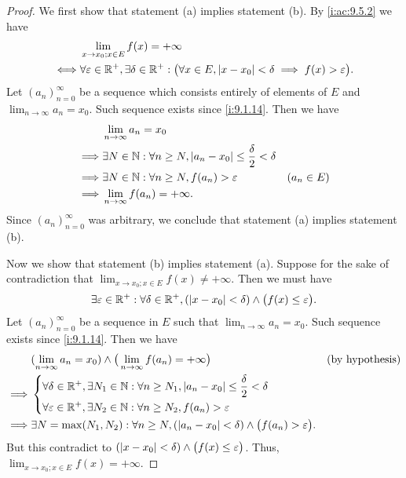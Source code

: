 \begin{proof}
  We first show that statement (a) implies statement (b).
  By \cref{i:ac:9.5.2} we have
  \begin{align*}
         & \lim_{x \to x_0 ; x \in E} f(x) = +\infty                                                                                              \\
    \iff & \forall \varepsilon \in \mathbb{R}^+, \exists \delta \in \mathbb{R}^+ : \big(\forall x \in E, \left\lvert x - x_0\right\rvert < \delta \implies f(x) > \varepsilon\big).
  \end{align*}
  Let \((a_n)_{n = 0}^\infty\) be a sequence which consists entirely of elements of \(E\) and \(\lim_{n \to \infty} a_n = x_0\).
  Such sequence exists since \cref{i:9.1.14}.
  Then we have
  \begin{align*}
             & \lim_{n \to \infty} a_n = x_0                                                                      \\
    \implies & \exists N \in \mathbb{N} : \forall n \geq N, \left\lvert a_n - x_0\right\rvert \leq \dfrac{\delta}{2} < \delta               \\
    \implies & \exists N \in \mathbb{N} : \forall n \geq N, f(a_n) > \varepsilon                            & (a_n \in E) \\
    \implies & \lim_{n \to \infty} f(a_n) = +\infty.
  \end{align*}
  Since \((a_n)_{n = 0}^\infty\) was arbitrary, we conclude that statement (a) implies statement (b).

  Now we show that statement (b) implies statement (a).
  Suppose for the sake of contradiction that \(\lim_{x \to x_0 ; x \in E} f(x) \neq +\infty\).
  Then we must have
  \[
    \exists \varepsilon \in \mathbb{R}^+ : \forall \delta \in \mathbb{R}^+, (\left\lvert x - x_0\right\rvert < \delta) \land \big(f(x) \leq \varepsilon\big).
  \]
  Let \((a_n)_{n = 0}^\infty\) be a sequence in \(E\) such that \(\lim_{n \to \infty} a_n = x_0\).
  Such sequence exists since \cref{i:9.1.14}.
  Then we have
  \begin{align*}
             & (\lim_{n \to \infty} a_n = x_0) \land \big(\lim_{n \to \infty} f(a_n) = +\infty\big)                                 &  & \text{(by hypothesis)} \\
    \implies & \begin{dcases}
                 \forall \delta \in \mathbb{R}^+, \exists N_1 \in \mathbb{N} : \forall n \geq N_1, \left\lvert a_n - x_0\right\rvert \leq \dfrac{\delta}{2} < \delta \\
                 \forall \varepsilon \in \mathbb{R}^+, \exists N_2 \in \mathbb{N} : \forall n \geq N_2, f(a_n) > \varepsilon
               \end{dcases}                                \\
    \implies & \exists N = \max(N_1, N_2) : \forall n \geq N, (\left\lvert a_n - x_0\right\rvert < \delta) \land \big(f(a_n) > \varepsilon\big).
  \end{align*}
  But this contradict to \((\left\lvert x - x_0\right\rvert < \delta) \land \big(f(x) \leq \varepsilon\big)\).
  Thus, \(\lim_{x \to x_0 ; x \in E} f(x) = +\infty\).
\end{proof}

